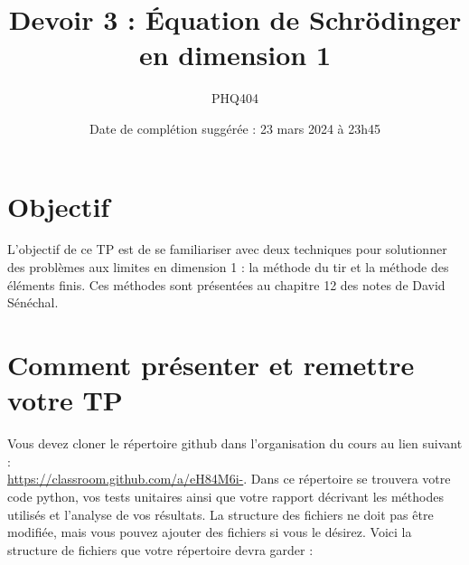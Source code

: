 \documentclass[12pt, letterpaper]{article}
\begin{document}
\title{Devoir 3 : Équation de Schrödinger en dimension 1}
\author{PHQ404}
\date{Date de complétion suggérée : 23 mars 2024 à 23h45}
\maketitle

\section{Objectif}\label{sec:objectif}

\noindent L’objectif de ce TP est de se familiariser avec deux techniques pour solutionner des problèmes aux limites
en dimension 1 : la méthode du tir et la méthode des éléments finis.
Ces méthodes sont présentées au chapitre 12 des notes de David Sénéchal.


\section{Comment présenter et remettre votre TP}\label{sec:comment-presenter-et-remettre-votre-tp}

\noindent Vous devez cloner le répertoire github dans l'organisation du cours au lien suivant :\\
\href{https://classroom.github.com/a/eH84M6i-}{https://classroom.github.com/a/eH84M6i-}.
Dans ce répertoire se trouvera votre code python, vos tests unitaires ainsi que votre rapport
décrivant les méthodes utilisés et l'analyse de vos résultats.
La structure des fichiers ne doit pas être modifiée, mais vous pouvez ajouter des fichiers si vous le désirez.
Voici la structure de fichiers que votre répertoire devra garder :

\bigskip
\end{document}
